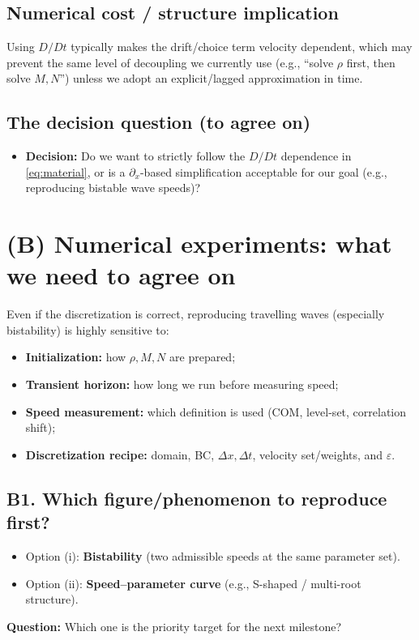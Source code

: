 \documentclass[11pt]{article}
\newcommand{\Dt}{\Delta t}
\newcommand{\Dx}{\Delta x}
\newcommand{\eps}{\varepsilon}
\begin{document}
\subsection*{Numerical cost / structure implication}
Using $D/Dt$ typically makes the drift/choice term velocity dependent, which may prevent the same level of decoupling we currently use (e.g., ``solve $\rho$ first, then solve $M,N$'') unless we adopt an explicit/lagged approximation in time.

\subsection*{The decision question (to agree on)}
\begin{itemize}[leftmargin=1.4em]
\item \textbf{Decision:} Do we want to strictly follow the $D/Dt$ dependence in \eqref{eq:material}, or is a $\partial_x$-based simplification acceptable for our goal (e.g., reproducing bistable wave speeds)?
\end{itemize}

\section*{(B) Numerical experiments: what we need to agree on}
Even if the discretization is correct, reproducing travelling waves (especially bistability) is highly sensitive to:
\begin{itemize}[leftmargin=1.4em]
\item \textbf{Initialization:} how $\rho, M, N$ are prepared;
\item \textbf{Transient horizon:} how long we run before measuring speed;
\item \textbf{Speed measurement:} which definition is used (COM, level-set, correlation shift);
\item \textbf{Discretization recipe:} domain, BC, $\Dx,\Dt$, velocity set/weights, and $\eps$.
\end{itemize}

\subsection*{B1. Which figure/phenomenon to reproduce first?}
\begin{itemize}[leftmargin=1.4em]
\item Option (i): \textbf{Bistability} (two admissible speeds at the same parameter set).
\item Option (ii): \textbf{Speed--parameter curve} (e.g., S-shaped / multi-root structure).
\end{itemize}
\textbf{Question:} Which one is the priority target for the next milestone?
\end{document}
